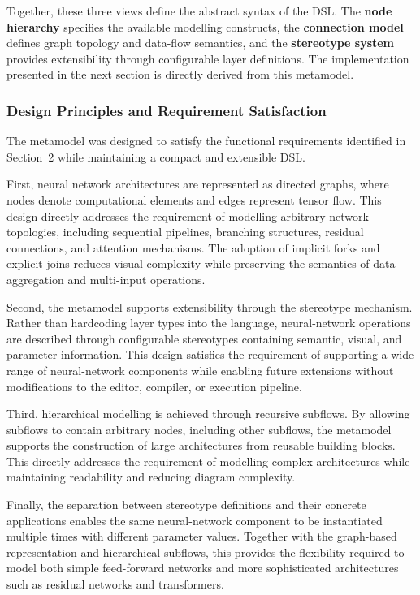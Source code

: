 \documentclass[11pt,a4paper]{article}
\begin{document}
Together, these three views define the abstract syntax of the DSL. The \textbf{node hierarchy} specifies the available modelling constructs, the \textbf{connection model} defines graph topology and data-flow semantics, and the \textbf{stereotype system} provides extensibility through configurable layer definitions. The implementation presented in the next section is directly derived from this metamodel.

\pagebreak

\subsubsection{Design Principles and Requirement Satisfaction}

The metamodel was designed to satisfy the functional requirements identified in Section~2 while maintaining a compact and extensible DSL.

First, neural network architectures are represented as directed graphs, where nodes denote computational elements and edges represent tensor flow. This design directly addresses the requirement of modelling arbitrary network topologies, including sequential pipelines, branching structures, residual connections, and attention mechanisms. The adoption of implicit forks and explicit joins reduces visual complexity while preserving the semantics of data aggregation and multi-input operations.

Second, the metamodel supports extensibility through the stereotype mechanism. Rather than hardcoding layer types into the language, neural-network operations are described through configurable stereotypes containing semantic, visual, and parameter information. This design satisfies the requirement of supporting a wide range of neural-network components while enabling future extensions without modifications to the editor, compiler, or execution pipeline.

Third, hierarchical modelling is achieved through recursive subflows. By allowing subflows to contain arbitrary nodes, including other subflows, the metamodel supports the construction of large architectures from reusable building blocks. This directly addresses the requirement of modelling complex architectures while maintaining readability and reducing diagram complexity.

Finally, the separation between stereotype definitions and their concrete applications enables the same neural-network component to be instantiated multiple times with different parameter values. Together with the graph-based representation and hierarchical subflows, this provides the flexibility required to model both simple feed-forward networks and more sophisticated architectures such as residual networks and transformers.
\end{document}
